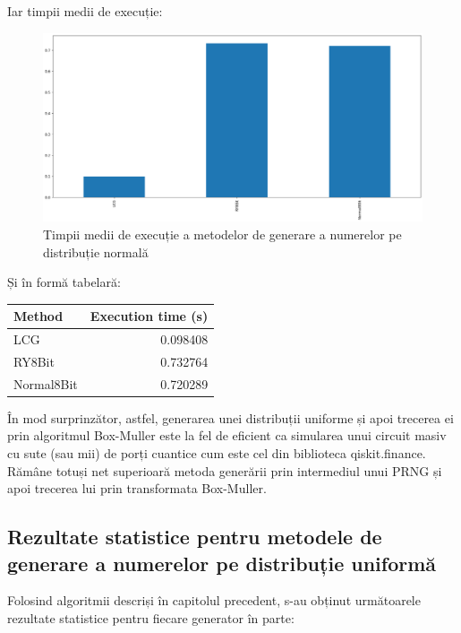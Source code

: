 Iar timpii medii de execuție:

\begin{figure}[H]
    \centering
    \includegraphics[width=1.0\textwidth]{continut/capitol4/figuri/NormalMeanTimes.png}
    \caption{Timpii medii de execuție a metodelor de generare a numerelor pe distribuție normală}
    \label{fig:NormalMeanTimes}
\end{figure}

Și în formă tabelară:

\begin{tabular}{|l|r|}
\hline
{Method} & {Execution time (s)} \\
\hline
LCG        &  0.098408 \\
RY8Bit     &  0.732764 \\
Normal8Bit &  0.720289 \\
\hline
\end{tabular}

În mod surprinzător, astfel, generarea unei distribuții uniforme și apoi trecerea ei prin algoritmul Box-Muller este la fel de eficient ca simularea unui circuit masiv cu sute (sau mii) de porți cuantice cum este cel din biblioteca qiskit.finance. Rămâne totuși net superioară metoda generării prin intermediul unui PRNG și apoi trecerea lui prin transformata Box-Muller.

\subsection{Rezultate statistice pentru metodele de generare a numerelor pe distribuție uniformă}

Folosind algoritmii descriși în capitolul precedent, s-au obținut următoarele rezultate statistice pentru fiecare generator în parte:

